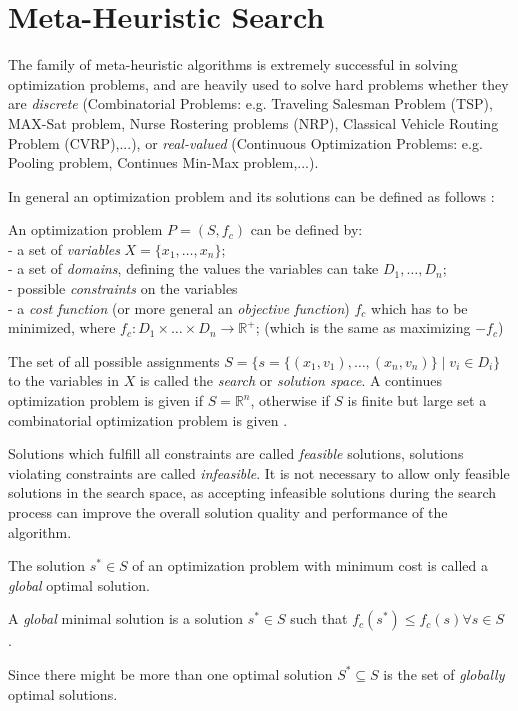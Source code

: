 \section{Meta-Heuristic Search}\label{sec:meta}
The family of meta-heuristic algorithms is extremely successful in solving optimization problems, and are heavily used to solve hard problems whether they are  \emph{discrete} (Combinatorial Problems: e.g. Traveling Salesman Problem (TSP), MAX-Sat problem, Nurse Rostering problems (NRP), Classical Vehicle Routing Problem (CVRP),...), or \emph{real-valued} (Continuous Optimization Problems: e.g. Pooling problem, Continues Min-Max problem,...).

In general an optimization problem and its solutions can be defined as follows  \cite{blum2003metaheuristics}: 
\begin{definition}\label{def:problem}
An optimization problem $P = (S, f_c)$ can be defined by:\\
- a set of \emph{variables} $X = \{x_1,\dots,x_n\} $;\\
- a set of \emph{domains}, defining the values the variables can take $D_1,\dots,D_n$;\\
- possible \emph{constraints} on the variables\\
- a \emph{cost function} (or more general an \emph{objective function}) $f_c$ which has to be minimized, where $f_c:D_1 \times \dots \times D_n \rightarrow \mathbb{R}^+$; (which is the same as maximizing $-f_c$)\\
\end{definition}
The set of all possible assignments $S = \{s = \{(x_1,v_1),\dots,(x_n,v_n)\}\mid v_i \in D_i\}$ to the variables in $X$ is called the \emph{search} or \emph{solution space}.
A continues optimization problem is given if $S=\mathbb{R}^n$, otherwise if $S$ is finite but large set a combinatorial optimization problem is given \cite{VNS}. 

Solutions which fulfill all constraints are called \emph{feasible} solutions, solutions violating constraints are called \emph{infeasible}. 
It is not necessary to allow only feasible solutions in the search space, as accepting infeasible solutions during the search process can improve the overall solution quality and performance of the algorithm.

The solution $s^*\in S$ of an optimization problem with minimum cost is called a \emph{global} optimal solution. 
\begin{definition}
 A \emph{global} minimal solution is a solution $s^* \in S$ such that
 $f_c(s^*)\leq f_c(s) \forall s \in S$ \cite{blum2003metaheuristics}. 
\end{definition}
Since there might be more than one optimal solution $S^* \subseteq S$ is the set of \emph{globally} optimal solutions.

